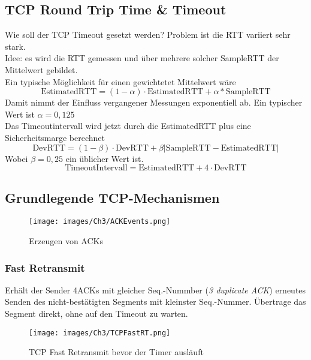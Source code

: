 \subsection{TCP Round Trip Time \& Timeout}
Wie soll der TCP Timeout gesetzt werden? Problem ist die RTT variiert sehr stark.\\
\noindent Idee: es wird die RTT gemessen und über mehrere solcher SampleRTT der Mittelwert gebildet.\\
Ein typische Möglichkeit für einen gewichtetet Mittelwert wäre 
\begin{equation}
    \text{EstimatedRTT} = (1-\alpha)\cdot \text{EstimatedRTT} + \alpha*\text{SampleRTT}
\end{equation}
Damit nimmt der Einfluss vergangener Messungen exponentiell ab. Ein typischer Wert ist $\alpha=0,125$\\

Das Timeoutintervall wird jetzt durch die EstimatedRTT plus eine Sicherheitsmarge berechnet
\begin{equation}
    \text{DevRTT}=(1-\beta)\cdot \text{DevRTT} + \beta |\text{SampleRTT}-\text{EstimatedRTT}|
\end{equation}
Wobei $\beta=0,25$ ein üblicher Wert ist.
\begin{equation}
    \text{TimeoutIntervall} = \text{EstimatedRTT} + 4\cdot\text{DevRTT}
\end{equation}

\subsection{Grundlegende TCP-Mechanismen}

\begin{figure}[H]
    \centering
    \texttt{[image: images/Ch3/ACKEvents.png]}
    \caption{Erzeugen von ACKs}
    \label{Ch03-TCP-ACKEvents}
\end{figure}

\subsubsection{Fast Retransmit}
Erhält der Sender 4ACKs mit gleicher Seq.-Nummber (\emph{3 duplicate ACK}) erneutes Senden des nicht-bestätigten Segments mit kleinster Seq.-Nummer. Übertrage das Segment direkt, ohne auf den Timeout zu warten.


\begin{figure}[H]
    \centering
    \texttt{[image: images/Ch3/TCPFastRT.png]}
    \caption{TCP Fast Retransmit bevor der Timer ausläuft}
    \label{Ch03-TCP-FRT}
\end{figure}

